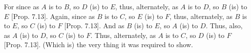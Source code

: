 \begin{Parallel}{}{}
{For since as $A$ is to $B$, so $D$ (is) to $E$, thus, alternately, as $A$ is to $D$, so
$B$ (is) to $E$  [Prop. 7.13]. Again, since
as $B$ is to $C$, so $E$ (is) to $F$, thus, alternately, as $B$ is to $E$, so $C$ (is) to $F$
[Prop. 7.13]. And as $B$ (is) to $E$, so
$A$ (is) to $D$. Thus, also, as $A$ (is) to $D$, so $C$ (is) to $F$. Thus,
alternately, as $A$ is to $C$, so $D$ (is) to $F$ [Prop. 7.13]. (Which is) the very thing it was required to show.}
\end{Parallel}


\vspace{7pt}{\footnotesize\noindent$^\dag$ In modern notation, this
proposition states that if $a:b::d:e$ and $b:c::e:f$ then $a:c::d:f$, where
all symbols denote numbers.}

